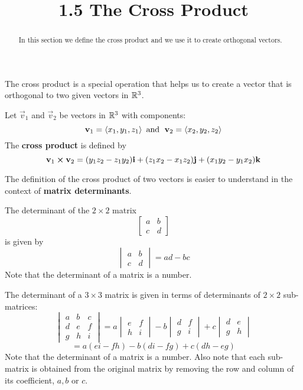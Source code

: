 \documentclass[handout]{ximera}
\title{1.5 The Cross Product}
\begin{document}
\begin{abstract}
In this section we define the cross product and we use it to create orthogonal vectors.
\end{abstract}
 
\maketitle
The cross product is a special operation that helps us to create a vector that is orthogonal to two given vectors in $\mathbb R^3$.
\begin{definition}
Let $\vec{v}_1$ and $\vec{v}_2$ be vectors in $\mathbb R^3$ with components:
\[
\mathbf{v}_1 = \left\langle x_1, y_1, z_1\right\rangle \text{  and   } \;\mathbf{v}_2 = \left\langle x_2, y_2, z_2\right\rangle
\]
The \textbf{cross product} is defined by
\[
\mathbf{v}_1 \boldsymbol\times \mathbf{v}_2 =  (y_1z_2 - z_1y_2) \mathbf{i} + (z_1x_2 - x_1z_2) \mathbf{j} + (x_1y_2 - y_1x_2) \mathbf{k} 
\]
\end{definition}

The definition of the cross product of two vectors is easier to understand in the context of \textbf{matrix determinants}.

\begin{definition}
The determinant of the $2 \times 2$ matrix 
\[
\begin{bmatrix}
a & b\\
c & d
\end{bmatrix}
\]
is  given by
\[
\begin{vmatrix}
a & b\\
c & d
\end{vmatrix}
= ad-bc
\]
Note that the determinant of a matrix is a number.
\end{definition}

\begin{definition}
The determinant of a $3 \times 3$ matrix is given in terms of determinants of $2 \times 2$ sub-matrices:
\[
\begin{vmatrix}
a & b & c\\
d & e & f\\
g & h & i
\end{vmatrix}
= a\begin{vmatrix}
 e & f\\
 h & i
\end{vmatrix}
-b
\begin{vmatrix}

d  & f\\
g  & i
\end{vmatrix}
+c\begin{vmatrix}
d & e \\
g & h 
\end{vmatrix}
\]
\[
= a(ei-fh) - b(di-fg) + c(dh-eg)
\]
Note that the determinant of a matrix is a number. 
Also note that each sub-matrix is obtained from the original matrix by removing the row and column of its coefficient, $a, b$ or $c$. 
\end{definition}
\end{document}
